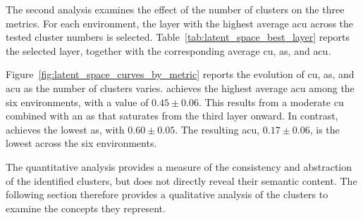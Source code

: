 The second analysis examines the effect of the number of clusters on the three metrics.
For each environment, the layer with the highest average \gls{acu} across the tested cluster numbers is selected.
Table~\ref{tab:latent_space_best_layer} reports the selected layer, together with the corresponding average \gls{cu}, \gls{as}, and \gls{acu}.

Figure~\ref{fig:latent_space_curves_by_metric} reports the evolution of \gls{cu}, \gls{as}, and \gls{acu} as the number of clusters varies.
\PongName achieves the highest average \gls{acu} among the six environments, with a value of $0.45 \pm 0.06$.
This results from a moderate \gls{cu} combined with an \gls{as} that saturates from the third layer onward.
In contrast, \MsPacManName achieves the lowest \gls{as}, with $0.60 \pm 0.05$.
The resulting \gls{acu}, $0.17 \pm 0.06$, is the lowest across the six environments.

The quantitative analysis provides a measure of the consistency and abstraction of the identified clusters, but does not directly reveal their semantic content.
The following section therefore provides a qualitative analysis of the clusters to examine the concepts they represent.

\vspace{1cm}



